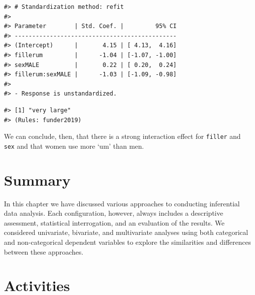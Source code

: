 \documentclass[
  letterpaper,
]{latex/krantz}
\newenvironment{Shaded}{\begin{snugshade}}{\end{snugshade}}
\newcommand{\CommentTok}[1]{\textcolor[rgb]{0.37,0.37,0.37}{#1}}
\newcommand{\DecValTok}[1]{\textcolor[rgb]{0.68,0.00,0.00}{#1}}
\newcommand{\FunctionTok}[1]{\textcolor[rgb]{0.28,0.35,0.67}{#1}}
\newcommand{\NormalTok}[1]{\textcolor[rgb]{0.00,0.23,0.31}{#1}}
\newcommand{\SpecialCharTok}[1]{\textcolor[rgb]{0.37,0.37,0.37}{#1}}
\begin{document}
\begin{verbatim}
#> # Standardization method: refit
#> 
#> Parameter        | Std. Coef. |         95% CI
#> ----------------------------------------------
#> (Intercept)      |       4.15 | [ 4.13,  4.16]
#> fillerum         |      -1.04 | [-1.07, -1.00]
#> sexMALE          |       0.22 | [ 0.20,  0.24]
#> fillerum:sexMALE |      -1.03 | [-1.09, -0.98]
#> 
#> - Response is unstandardized.
\end{verbatim}

\begin{Shaded}
\end{Shaded}

\begin{verbatim}
#> [1] "very large"
#> (Rules: funder2019)
\end{verbatim}

We can conclude, then, that there is a strong interaction effect for
\texttt{filler} and \texttt{sex} and that women use more `um' than men.

\hypertarget{summary-11}{%
\section{Summary}\label{summary-11}}

In this chapter we have discussed various approaches to conducting
inferential data analysis. Each configuration, however, always includes
a descriptive assessment, statistical interrogation, and an evaluation
of the results. We considered univariate, bivariate, and multivariate
analyses using both categorical and non-categorical dependent variables
to explore the similarities and differences between these approaches.

\hypertarget{activities-7}{%
\section*{Activities}\label{activities-7}}

\end{document}
